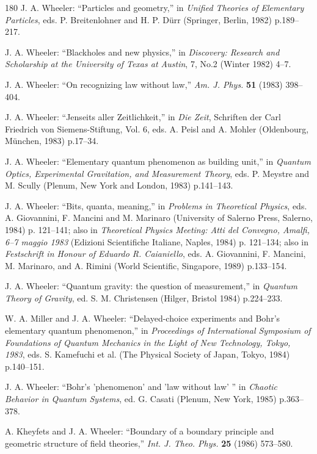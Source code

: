 \documentclass[11pt]{article}
\begin{document}
\begin{thebibliography}{180}
		J. A. Wheeler: ``Particles and geometry,'' in \emph{Unified Theories of Elementary Particles}, eds. P. Breitenlohner and H. P. Dürr (Springer, Berlin, 1982) p.189--217.
		
		J. A. Wheeler: ``Blackholes and new physics,'' in \emph{Discovery: Research and Scholarship at the University of Texas at Austin}, 7, No.2 (Winter 1982) 4--7.
		
		J. A. Wheeler: ``On recognizing law without law,'' \emph{Am. J. Phys.} \textbf{51} (1983) 398--404.
		
		J. A. Wheeler: ``Jenseits aller Zeitlichkeit,'' in \emph{Die Zeit}, Schriften der Carl Friedrich von Siemens-Stiftung, Vol. 6, eds. A. Peisl and A. Mohler (Oldenbourg, München, 1983) p.17--34.
		
		J. A. Wheeler: ``Elementary quantum phenomenon as building unit,'' in \emph{Quantum Optics, Experimental Gravitation, and Measurement Theory}, eds. P. Meystre and M. Scully (Plenum, New York and London, 1983) p.141--143.
		
		J. A. Wheeler: ``Bits, quanta, meaning,'' in \emph{Problems in Theoretical Physics}, eds. A. Giovannini, F. Mancini and M. Marinaro (University of Salerno Press, Salerno, 1984) p. 121--141; also in \emph{Theoretical Physics Meeting: Atti del Convegno, Amalfi, 6--7 maggio 1983} (Edizioni Scientifiche Italiane, Naples, 1984) p. 121--134; also in \emph{Festschrift in Honour of Eduardo R. Caianiello}, eds. A. Giovannini, F. Mancini, M. Marinaro, and A. Rimini (World Scientific, Singapore, 1989) p.133--154.
		
		J. A. Wheeler: ``Quantum gravity: the question of measurement,'' in \emph{Quantum Theory of Gravity}, ed. S. M. Christensen (Hilger, Bristol 1984) p.224--233.
		
		W. A. Miller and J. A. Wheeler: ``Delayed-choice experiments and Bohr's elementary quantum phenomenon,'' in \emph{Proceedings of International Symposium of Foundations of Quantum Mechanics in the Light of New Technology, Tokyo, 1983}, eds. S. Kamefuchi et al. (The Physical Society of Japan, Tokyo, 1984) p.140--151.
		
		J. A. Wheeler: ``Bohr's 'phenomenon' and 'law without law' '' in \emph{Chaotic Behavior in Quantum Systems}, ed. G. Casati (Plenum, New York, 1985) p.363--378.
		
		A. Kheyfets and J. A. Wheeler: ``Boundary of a boundary principle and geometric structure of field theories,'' \emph{Int. J. Theo. Phys.} \textbf{25} (1986) 573--580.
		

\end{thebibliography}
\end{document}
